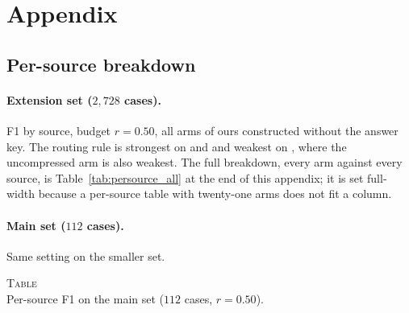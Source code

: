 \section{Appendix}
\label{sec:appendix}

\subsection{Per-source breakdown}

\paragraph{Extension set ($2{,}728$ cases).}
F1 by source, budget $r=0.50$, all arms of ours constructed without the answer key. The
routing rule is strongest on  and  and weakest on
, where the uncompressed arm is also weakest. The full breakdown, every arm
against every source, is Table~\ref{tab:persource_all} at the end of this appendix; it is set
full-width because a per-source table with twenty-one arms does not fit a column.


\vspace{2pt}

\paragraph{Main set ($112$ cases).}
Same setting on the smaller set.

\begin{center}
{%
\label{tab:app_persource_main}%
\footnotesize\textsc{Table \thetable}\\[1pt]
Per-source F1 on the main set ($112$ cases, $r=0.50$).\par}
\vspace{3pt}
{\small\setlength{\tabcolsep}{3pt}%
}
\end{center}
\vspace{2pt}

